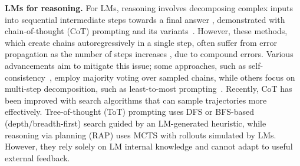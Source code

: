 \documentclass{article}
\theoremstyle{plain}
\theoremstyle{definition}
\theoremstyle{remark}
\begin{document}

\textbf{LMs for reasoning.} For LMs, reasoning involves decomposing complex inputs into sequential intermediate steps towards a final answer \citep{cobbe2021training}, demonstrated with chain-of-thought (CoT) prompting \citep{wei2022chain} and its variants~\citep{wei2022chain, kojima2022large, wang2022self}. However, these methods, which create chains autoregressively in a single step, often suffer from error propagation as the number of steps increases \citep{guo2018long,chen2022program}, due to compound errors. Various advancements aim to mitigate this issue; some approaches, such as self-consistency~\citep{wang2022self}, employ majority voting over sampled chains, while others focus on multi-step decomposition, such as least-to-most prompting~\citep{zhou2022least}. Recently, CoT has been improved with search algorithms \citep{yao2023tree,hao2023reasoning,besta2023graph} that can sample trajectories more effectively. Tree-of-thought (ToT) prompting \citep{yao2023tree} uses DFS or BFS-based (depth/breadth-first) search guided by an LM-generated heuristic, while reasoning via planning (RAP) \citep{hao2023reasoning} uses MCTS with rollouts simulated by LMs. However, they rely solely on LM internal knowledge and cannot adapt to useful external feedback.
\end{document}
